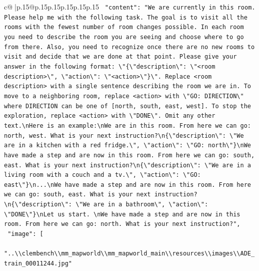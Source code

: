 \documentclass{article}
\begin{document}
{\begin{supertabular}{c@{$\;$}|p{.15\linewidth}@{}p{.15\linewidth}p{.15\linewidth}p{.15\linewidth}p{.15\linewidth}p{.15\linewidth}}
{{{\texttt{    "content": "We are currently in this room. Please help me with the following task. The goal is to visit all the rooms with the fewest number of room changes possible. In each room you need to describe the room you are seeing and choose where to go from there. Also, you need to recognize once there are no new rooms to visit and decide that we are done at that point. Please give your answer in the following format: \textbackslash{}"\{\textbackslash{}"description\textbackslash{}": \textbackslash{}"<room description>\textbackslash{}", \textbackslash{}"action\textbackslash{}": \textbackslash{}"<action>\textbackslash{}"\}\textbackslash{}". Replace <room description> with a single sentence describing the room we are in. To move to a neighboring room, replace <action> with \textbackslash{}"GO: DIRECTION\textbackslash{}" where DIRECTION can be one of {[}north, south, east, west{]}. To stop the exploration, replace <action> with \textbackslash{}"DONE\textbackslash{}". Omit any other text.\textbackslash{}nHere is an example:\textbackslash{}nWe are in this room. From here we can go: north, west. What is your next instruction?\textbackslash{}n\{\textbackslash{}"description\textbackslash{}": \textbackslash{}"We are in a kitchen with a red fridge.\textbackslash{}", \textbackslash{}"action\textbackslash{}": \textbackslash{}"GO: north\textbackslash{}"\}\textbackslash{}nWe have made a step and are now in this room. From here we can go: south, east. What is your next instruction?\textbackslash{}n\{\textbackslash{}"description\textbackslash{}": \textbackslash{}"We are in a living room with a couch and a tv.\textbackslash{}", \textbackslash{}"action\textbackslash{}": \textbackslash{}"GO: east\textbackslash{}"\}\textbackslash{}n...\textbackslash{}nWe have made a step and are now in this room. From here we can go: south, east. What is your next instruction?\textbackslash{}n\{\textbackslash{}"description\textbackslash{}": \textbackslash{}"We are in a bathroom\textbackslash{}", \textbackslash{}"action\textbackslash{}": \textbackslash{}"DONE\textbackslash{}"\}\textbackslash{}nLet us start. \textbackslash{}nWe have made a step and are now in this room. From here we can go: north. What is your next instruction?",} \\
\texttt{    "image": {[}} \\
\texttt{      "..\textbackslash{}\textbackslash{}clembench\textbackslash{}\textbackslash{}mm\_mapworld\textbackslash{}\textbackslash{}mm\_mapworld\_main\textbackslash{}\textbackslash{}resources\textbackslash{}\textbackslash{}images\textbackslash{}\textbackslash{}ADE\_train\_00011244.jpg"} \\
}}}
\end{supertabular}}
\end{document}
